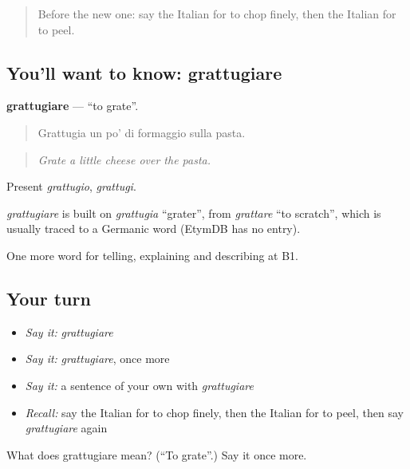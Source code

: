 \label{lesson:IT-C332-grattugiare}



\begin{quote}
Before the new one: say the Italian for to chop finely, then the Italian for to peel.
\end{quote}

\subsection*{You'll want to know: grattugiare}
\textbf{grattugiare} — \textquotedblleft{}to grate\textquotedblright{}.

\begin{quote}
Grattugia un po' di formaggio sulla pasta.
\end{quote}

\begin{quote}
\emph{Grate a little cheese over the pasta.}
\end{quote}

Present \emph{grattugio}, \emph{grattugi}.

\begin{cousinweb}
\emph{grattugiare} is built on \emph{grattugia} \textquotedblleft{}grater\textquotedblright{}, from \emph{grattare} \textquotedblleft{}to scratch\textquotedblright{}, which is usually traced to a Germanic word (EtymDB has no entry).
\end{cousinweb}

\begin{grammarlens}[title={What you've built}]
One more word for telling, explaining and describing at B1.
\end{grammarlens}

\subsection*{Your turn}
\begin{itemize}
\raggedright
  \item \emph{Say it:} \emph{grattugiare}
  \item \emph{Say it:} \emph{grattugiare}, once more
  \item \emph{Say it:} a sentence of your own with \emph{grattugiare}
  \item \emph{Recall:} say the Italian for to chop finely, then the Italian for to peel, then say \emph{grattugiare} again
\end{itemize}

\begin{tcolorbox}[breakable,colback=teal!4,colframe=teal!35!black,title={Before you move on}]
What does grattugiare mean? (\textquotedblleft{}To grate\textquotedblright{}.) Say it once more.
\end{tcolorbox}
